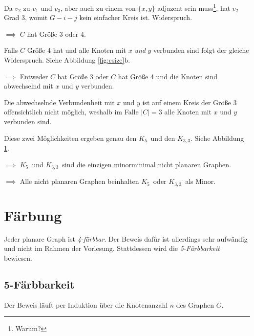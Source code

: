 \documentclass[10pt,a4paper]{article}
\makeatletter
\def\maxwidth#1{\ifdim\Gin@nat@width>#1 #1\else\Gin@nat@width\fi}
\newcommand{\imageFigureMultS}[7]{%
    \begin{figure}[h]%
        \centering
        \subfloat[#1]{{\texttt{[image: \#2]} }}%
        \qquad
        \subfloat[#3]{{\texttt{[image: \#4]} }}%
        \caption{#5}%
        \label{fig:#6}%
    \end{figure}
}
\newcommand{\Kf}{$K_5$}
\newcommand{\Kdd}{$K_{3,3}$}
\makeatother
\begin{document}
Da $v_2$ zu $v_1$ und $v_3$, aber auch zu einem von $\{x, y\}$ adjazent sein
muss\footnote{Warum?}, hat $v_2$ Grad 3, womit $G - i - j$ kein einfacher Kreis
ist. Widerspruch.

$\implies$ $C$ hat Größe 3 oder 4.

Falls $C$ Größe 4 hat und alle Knoten mit $x$ \textit{und} $y$ verbunden sind
folgt der gleiche Widerspruch.
Siehe Abbildung \ref{fig:csize}b.

$\implies$ Entweder $C$ hat Größe 3 oder $C$ hat Größe 4 und die Knoten sind
abwechselnd mit $x$ und $y$ verbunden.

Die abwechselnde Verbundenheit mit $x$ und $y$ ist auf einem Kreis der Größe 3
offensichtlich nicht möglich, weshalb im Falle $|C|=3$ alle Knoten mit $x$ und
$y$ verbunden sind.

Diese zwei Möglichkeiten ergeben genau den \Kf~und den \Kdd.
Siehe Abbildung \ref{fig:proof-k5}.

$\implies$ \Kf~und \Kdd~sind die einzigen minorminimal nicht planaren Graphen.

$\implies$ Alle nicht planaren Graphen beinhalten \Kf~oder \Kdd~als Minor.

\imageFigureMultS{\Kf}{proof-k5.png}{\Kdd}{proof-k33.png}{}{proof-k5}{.3}


\clearpage
\section{Färbung}
Jeder planare Graph ist \textit{4-färbbar}.
Der Beweis dafür ist allerdings sehr aufwändig und nicht im Rahmen der
Vorlesung.
Stattdessen wird die \textit{5-Färbbarkeit} bewiesen.

\subsection{5-Färbbarkeit}
Der Beweis läuft per Induktion über die Knotenanzahl $n$ des Graphen $G$.
\end{document}
